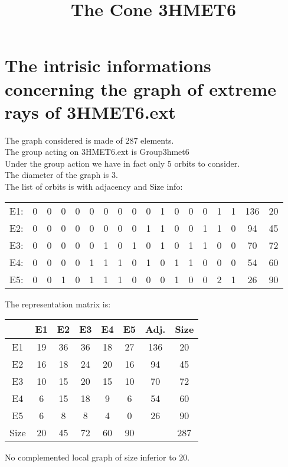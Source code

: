 \documentclass[12pt]{article}
\title{The Cone 3HMET6}
\begin{document}
\maketitle
\section{The intrisic informations concerning the graph of extreme rays of 3HMET6.ext}
The graph considered is made of $287$ elements.\\
The group acting on 3HMET6.ext is Group3hmet6\\
Under the group action we have in fact only $5$ orbits to consider.\\
The diameter of the graph is $3$.\\
The list of orbits is with adjacency and Size info:
\begin{center}
\scriptsize
\begin{tabular}{cccccccccccccccc|c|c}
E1:&0&0&0&0&0&0&0&0&0&1&0&0&0&1&1&136&20\\
E2:&0&0&0&0&0&0&0&0&1&1&0&0&1&1&0&94&45\\
E3:&0&0&0&0&0&1&0&1&0&1&0&1&1&0&0&70&72\\
E4:&0&0&0&0&1&1&1&0&1&0&1&1&0&0&0&54&60\\
E5:&0&0&1&0&1&1&1&0&0&0&1&0&0&2&1&26&90\\
\end{tabular}
\end{center}
The representation matrix is:
\begin{center}
\scriptsize
\begin{tabular}{|c|ccccc|c|c|}
\hline
&E1&E2&E3&E4&E5&Adj.&Size\\
\hline
E1& 19& 36& 36& 18& 27&136&20\\
E2& 16& 18& 24& 20& 16&94&45\\
E3& 10& 15& 20& 15& 10&70&72\\
E4& 6& 15& 18& 9& 6&54&60\\
E5& 6& 8& 8& 4& 0&26&90\\
\hline
Size&20&45&72&60&90&&287\\
\hline
\end{tabular}
\end{center}
No complemented local graph of size inferior to $20$.
\end{document}
